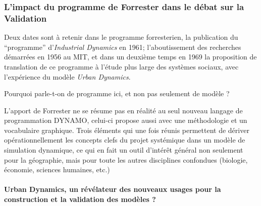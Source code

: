 



\subsubsection{L'impact du programme de Forrester dans le débat sur la Validation}
\label{sssec:forrester_impact}

Deux dates sont à retenir dans le programme forresterien, la publication du \enquote{programme} d'\textit{Industrial Dynamics} en 1961; l'aboutissement des recherches démarrées en 1956 au MIT, et dans un deuxième temps en 1969 la proposition de translation de ce programme à l'étude plus large des systèmes sociaux, avec l'expérience du modèle \textit{Urban Dynamics}.

Pourquoi parle-t-on de programme ici, et non pas seulement de modèle ?

L'apport de Forrester ne se résume pas en réalité au seul nouveau langage de programmation DYNAMO, celui-ci propose aussi avec une méthodologie et un vocabulaire graphique. Trois éléments qui une fois réunis permettent de dériver opérationnellement les concepts clefs du projet systémique dans un modèle de simulation dynamique, ce qui en fait un outil d'intérêt général non seulement pour la géographie, mais pour toute les autres disciplines confondues (biologie, économie, sciences humaines, etc.) \autocite{Rosnay1975}

\paragraph{Urban Dynamics, un révélateur des nouveaux usages pour la construction et la validation des modèles ?}
\label{p:urbanDyn_revelateur}

